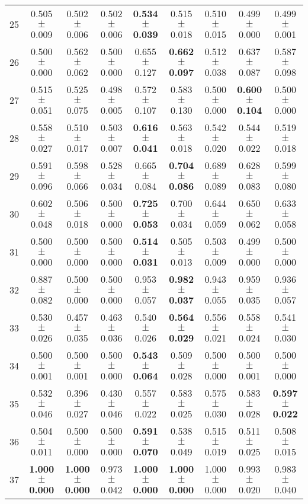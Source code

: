 \begin{table}[!ht]
{\begin{tabular}{r c c c c c c c c}
25 & 0.505 $\pm$ 0.009 & 0.502 $\pm$ 0.006 & 0.502 $\pm$ 0.006 & \textbf{0.534 $\pm$ 0.039} & 0.515 $\pm$ 0.018 & 0.510 $\pm$ 0.015 & 0.499 $\pm$ 0.000 & 0.499 $\pm$ 0.001 \\
26 & 0.500 $\pm$ 0.000 & 0.562 $\pm$ 0.062 & 0.500 $\pm$ 0.000 & 0.655 $\pm$ 0.127 & \textbf{0.662 $\pm$ 0.097} & 0.512 $\pm$ 0.038 & 0.637 $\pm$ 0.087 & 0.587 $\pm$ 0.098 \\
27 & 0.515 $\pm$ 0.051 & 0.525 $\pm$ 0.075 & 0.498 $\pm$ 0.005 & 0.572 $\pm$ 0.107 & 0.583 $\pm$ 0.130 & 0.500 $\pm$ 0.000 & \textbf{0.600 $\pm$ 0.104} & 0.500 $\pm$ 0.000 \\
28 & 0.558 $\pm$ 0.027 & 0.510 $\pm$ 0.017 & 0.503 $\pm$ 0.007 & \textbf{0.616 $\pm$ 0.041} & 0.563 $\pm$ 0.018 & 0.542 $\pm$ 0.020 & 0.544 $\pm$ 0.022 & 0.519 $\pm$ 0.018 \\
29 & 0.591 $\pm$ 0.096 & 0.598 $\pm$ 0.066 & 0.528 $\pm$ 0.034 & 0.665 $\pm$ 0.084 & \textbf{0.704 $\pm$ 0.086} & 0.689 $\pm$ 0.089 & 0.628 $\pm$ 0.083 & 0.599 $\pm$ 0.080 \\
30 & 0.602 $\pm$ 0.048 & 0.506 $\pm$ 0.018 & 0.500 $\pm$ 0.000 & \textbf{0.725 $\pm$ 0.053} & 0.700 $\pm$ 0.034 & 0.644 $\pm$ 0.059 & 0.650 $\pm$ 0.062 & 0.633 $\pm$ 0.058 \\
31 & 0.500 $\pm$ 0.000 & 0.500 $\pm$ 0.000 & 0.500 $\pm$ 0.000 & \textbf{0.514 $\pm$ 0.031} & 0.505 $\pm$ 0.013 & 0.503 $\pm$ 0.009 & 0.499 $\pm$ 0.000 & 0.500 $\pm$ 0.000 \\
32 & 0.887 $\pm$ 0.082 & 0.500 $\pm$ 0.000 & 0.500 $\pm$ 0.000 & 0.953 $\pm$ 0.057 & \textbf{0.982 $\pm$ 0.037} & 0.943 $\pm$ 0.055 & 0.959 $\pm$ 0.035 & 0.936 $\pm$ 0.057 \\
33 & 0.530 $\pm$ 0.026 & 0.457 $\pm$ 0.035 & 0.463 $\pm$ 0.036 & 0.540 $\pm$ 0.026 & \textbf{0.564 $\pm$ 0.029} & 0.556 $\pm$ 0.021 & 0.558 $\pm$ 0.024 & 0.541 $\pm$ 0.030 \\
34 & 0.500 $\pm$ 0.001 & 0.500 $\pm$ 0.001 & 0.500 $\pm$ 0.000 & \textbf{0.543 $\pm$ 0.064} & 0.509 $\pm$ 0.028 & 0.500 $\pm$ 0.000 & 0.500 $\pm$ 0.001 & 0.500 $\pm$ 0.000 \\
35 & 0.532 $\pm$ 0.046 & 0.396 $\pm$ 0.027 & 0.430 $\pm$ 0.046 & 0.557 $\pm$ 0.022 & 0.583 $\pm$ 0.025 & 0.575 $\pm$ 0.030 & 0.583 $\pm$ 0.028 & \textbf{0.597 $\pm$ 0.022} \\
36 & 0.504 $\pm$ 0.011 & 0.500 $\pm$ 0.000 & 0.500 $\pm$ 0.000 & \textbf{0.591 $\pm$ 0.070} & 0.538 $\pm$ 0.049 & 0.515 $\pm$ 0.019 & 0.511 $\pm$ 0.025 & 0.508 $\pm$ 0.015 \\
37 & \textbf{1.000 $\pm$ 0.000} & \textbf{1.000 $\pm$ 0.000} & 0.973 $\pm$ 0.042 & \textbf{1.000 $\pm$ 0.000} & \textbf{1.000 $\pm$ 0.000} & 1.000 $\pm$ 0.000 & 0.993 $\pm$ 0.020 & 0.983 $\pm$ 0.040 \\

\end{tabular}}
\end{table}
